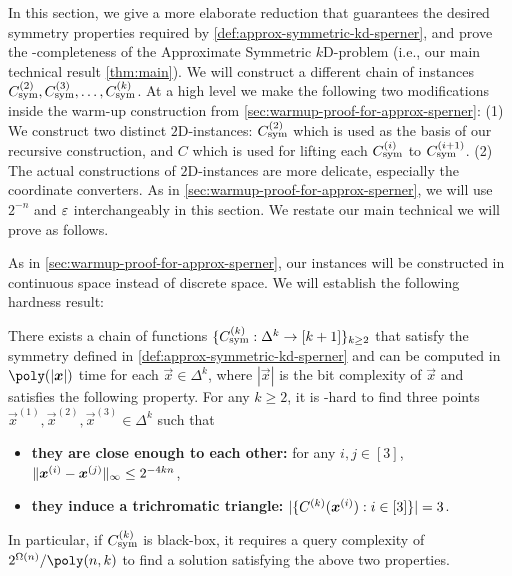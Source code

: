 In this section, we give a more elaborate reduction that guarantees the desired symmetry properties required by \cref{def:approx-symmetric-kd-sperner}, and prove the \PPAD-completeness of the Approximate Symmetric $k$D-\Sperner problem (i.e., our main technical result \cref{thm:main}).
We will construct a different chain of instances $C_{\rm sym}^{(2)},C_{\rm sym}^{(3)},\dots, C_{\rm sym}^{(k)}$.
At a high level we make the following two modifications inside the warm-up construction from \cref{sec:warmup-proof-for-approx-sperner}:
(1) We construct two distinct $2${\rm D}-\Sperner instances: $C_{\rm sym}^{(2)}$ which is used as the basis of our recursive construction,  
and $C$ which is used for lifting each $C_{\rm sym}^{(i)}$ to $C_{\rm sym}^{(i+1)}$. (2) The actual constructions of $2${\rm D}-\Sperner instances are more delicate, especially the coordinate converters.
As in \cref{sec:warmup-proof-for-approx-sperner}, we will use $2^{-n}$ and $\varepsilon$ interchangeably in this section.
We restate our main technical we will prove as follows.

\mainthm*

As in \cref{sec:warmup-proof-for-approx-sperner}, our instances will be constructed in continuous space instead of discrete space. 
We will establish the following hardness result:
\begin{theorem}
    \label{thm:continuous-symmetry-main}
    There exists a chain of functions $\{C_{\rm sym}^{(k)}: \Delta^k \to [k+1]\}_{k\geq 2}$ that satisfy the symmetry defined in \cref{def:approx-symmetric-kd-sperner} and can be computed in $\poly(|\vec{x}|)$ time for each $\vec{x}\in \Delta^k$, where $|\vec{x}|$ is the bit complexity of $\vec{x}$ and satisfies the following property. 
    For any $k\geq 2$, it is \PPAD-hard 
    to find three points $\vec{x}^{(1)}, \vec{x}^{(2)}, \vec{x}^{(3)}\in \Delta^{k}$ such that 
    \begin{itemize}[itemsep=0.2em, topsep=0.5em]
        \item {\bf they are close enough to each other:} for any $i,j\in [3]$, $\| {\boldsymbol{x}^{(i)}-\boldsymbol{x}^{(j)}} \|_{\infty}\leq 2^{-4kn}$, 
        \item {\bf they induce a trichromatic triangle:} $|\{{C^{(k)}(\boldsymbol{x}^{(i)}):i\in [3]} \}|=3$. 
    \end{itemize}
    In particular, if $C_{\rm sym}^{(k)}$ is black-box, it requires a query complexity of $2^{\Omega(n)}/\poly(n,k)$ to find a solution satisfying the above two properties. 
\end{theorem}

